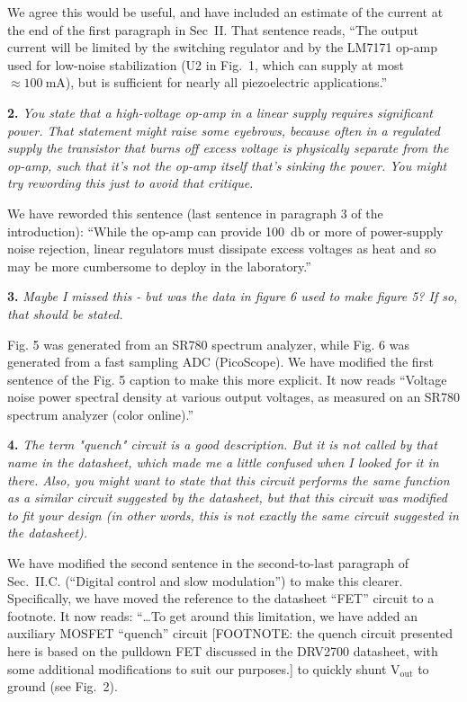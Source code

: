 \documentclass[12pt, oneside]{letter}   	%
\begin{document}
We agree this would be useful, and have included an estimate of the current at the end of the first paragraph in Sec~II.
That sentence reads, ``The output current will be limited by the switching regulator and by the LM7171 op-amp used for low-noise stabilization (U2 in Fig.~1, which can supply at most $\approx\SI{100}{\milli\ampere}$), but is sufficient for nearly all piezoelectric applications.''

\textbf{2.}
\textit{You state that a high-voltage op-amp in a linear supply requires significant power.
That statement might raise some eyebrows, because often in a regulated supply the transistor that burns off excess voltage is physically separate from the op-amp, such that it's not the op-amp itself that's sinking the power. 
You might try rewording this just to avoid that critique.}

We have reworded this sentence (last sentence in paragraph 3 of the introduction): ``While the op-amp can provide \SI{100}{\decibel} or more of power-supply noise rejection, linear regulators must dissipate excess voltages as heat and so may be more cumbersome to deploy in the laboratory.''


\textbf{3.}
\textit{Maybe I missed this - but was the data in figure 6 used to make figure 5? If so, that should be stated.}

Fig. 5 was generated from an SR780 spectrum analyzer, while Fig. 6 was generated from a fast sampling ADC (PicoScope).
We have modified the first sentence of the Fig. 5 caption to make this more explicit.
It now reads ``Voltage noise power spectral density at various output voltages, as measured on an SR780 spectrum analyzer (color online).''  

\textbf{4.}
\textit{The term "quench" circuit is a good description. But it is not called by that name in the datasheet, which made me a little confused when I looked for it in there. Also, you might want to state that this circuit performs the same function as a similar circuit suggested by the datasheet, but that this circuit was modified to fit your design (in other words, this is not exactly the same circuit suggested in the datasheet).}

We have modified the second sentence in the second-to-last paragraph of Sec.~II.C. (``Digital control and slow modulation'') to make this clearer.
Specifically, we have moved the reference to the datasheet ``FET'' circuit to a footnote.
It now reads: ``\ldots To get around this limitation, we have added an auxiliary MOSFET ``quench'' circuit [FOOTNOTE: the quench circuit presented here is based on the pulldown FET discussed in the DRV2700 datasheet, with some additional modifications to suit our purposes.] to quickly shunt $\text{V}_\text{out}$ to ground (see Fig.~2).
\end{document}
